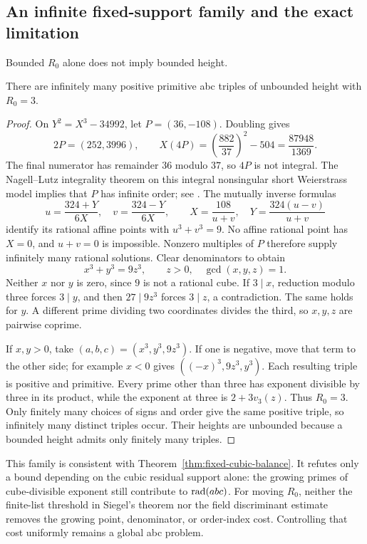 \subsection{An infinite fixed-support family and the exact limitation}

Bounded $R_0$ alone does not imply bounded height.
\begin{proposition}\label{prop:fixed-cubic-support-infinite}
There are infinitely many positive primitive abc triples of unbounded
height with $R_0=3$.
\end{proposition}
\begin{proof}
On $Y^2=X^3-34992$, let $P=(36,-108)$. Doubling gives
\[
 2P=(252,3996),\qquad
 X(4P)=\left(\frac{882}{37}\right)^2-504=\frac{87948}{1369}.
\]
The final numerator has remainder $36$ modulo $37$, so $4P$ is not
integral. The Nagell--Lutz integrality theorem on this integral
nonsingular short Weierstrass model implies that $P$ has infinite
order; see \cite[Theorem~24.21]{Sutherland}.
The mutually inverse formulas
\[
 u=\frac{324+Y}{6X},\quad v=\frac{324-Y}{6X},\qquad
 X=\frac{108}{u+v},\quad Y=\frac{324(u-v)}{u+v}
\]
identify its rational affine points with $u^3+v^3=9$.
No affine rational point has $X=0$, and $u+v=0$ is impossible.
Nonzero multiples of $P$ therefore supply infinitely many rational
solutions. Clear denominators to obtain
\[
 x^3+y^3=9z^3,\qquad z>0,\quad\gcd(x,y,z)=1.
\]
Neither $x$ nor $y$ is zero, since $9$ is not a rational cube.
If $3\mid x$, reduction modulo three forces $3\mid y$, and then
$27\mid9z^3$ forces $3\mid z$, a contradiction. The same holds for
$y$. A different prime dividing two coordinates divides the third,
so $x,y,z$ are pairwise coprime.

If $x,y>0$, take $(a,b,c)=(x^3,y^3,9z^3)$. If one is negative,
move that term to the other side; for example $x<0$ gives
$((-x)^3,9z^3,y^3)$. Each resulting triple is positive and primitive.
Every prime other than three has exponent divisible by three in its
product, while the exponent at three is $2+3v_3(z)$. Thus $R_0=3$.
Only finitely many choices of signs and order give the same positive
triple, so infinitely many distinct triples occur. Their heights are
unbounded because a bounded height admits only finitely many triples.
\end{proof}

This family is consistent with Theorem~\ref{thm:fixed-cubic-balance}.
It refutes only a bound depending on the cubic residual support alone:
the growing primes of cube-divisible exponent still contribute to
$\operatorname{rad}(abc)$. For moving $R_0$, neither the finite-list threshold in
Siegel's theorem nor the field discriminant estimate removes the
growing point, denominator, or order-index cost. Controlling that cost
uniformly remains a global abc problem.
